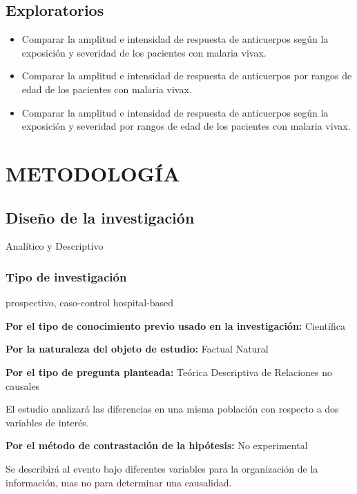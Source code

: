 \documentclass[]{article}
\begin{document}
\subsection{Exploratorios}\label{exploratorios}

\begin{itemize}
\item
  Comparar la amplitud e intensidad de respuesta de anticuerpos según la
  exposición y severidad de los pacientes con malaria vivax.
\item
  Comparar la amplitud e intensidad de respuesta de anticuerpos por
  rangos de edad de los pacientes con malaria vivax.
\item
  Comparar la amplitud e intensidad de respuesta de anticuerpos según la
  exposición y severidad por rangos de edad de los pacientes con malaria
  vivax.
\end{itemize}

\section{METODOLOGÍA}\label{metodologia}

\subsection{Diseño de la
investigación}\label{diseno-de-la-investigacion}

Analítico y Descriptivo

\subsubsection{Tipo de investigación}\label{tipo-de-investigacion}

prospectivo, caso-control hospital-based

\textbf{Por el tipo de conocimiento previo usado en la investigación:}
Científica

\textbf{Por la naturaleza del objeto de estudio:} Factual Natural

\textbf{Por el tipo de pregunta planteada:} Teórica Descriptiva de
Relaciones no causales

El estudio analizará las diferencias en una misma población con respecto
a dos variables de interés.

\textbf{Por el método de contrastación de la hipótesis:} No experimental

Se describirá al evento bajo diferentes variables para la organización
de la información, mas no para determinar una causalidad.
\end{document}
